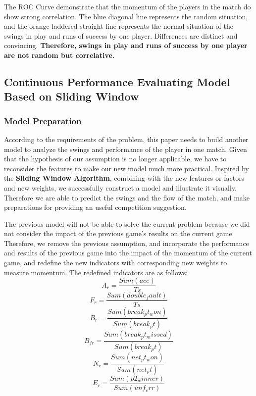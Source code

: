\documentclass{mcmthesis}
\begin{document}
The ROC Curve demonstrate that the momentum of the players in the match do show strong
correlation. The blue diagonal line represents the random situation, and the orange laddered
straight line represents the normal situation of the swings in play and runs of success by one player. Differences are distinct and convincing. {\bf Therefore, swings in play and runs of success by one
player are not random but correlative.}

\subsection{Continuous Performance Evaluating Model Based on Sliding Window}

\subsubsection{Model Preparation}
According to the requirements of the problem, this paper needs to build another model to
analyze the swings and performance of the player in one match. Given that the hypothesis of our
assumption is no longer applicable, we have to reconsider the features to make our new model
much more practical. Inspired by the {\bf Sliding Window Algorithm}, combining with the new
features or factors and new weights, we successfully construct a model and illustrate it visually. Therefore we are able to predict the swings and the flow of the match, and make preparations for
providing an useful competition suggestion.

 The previous model will not be able to solve the current problem because we did not consider
the impact of the previous game's results on the current game. Therefore, we remove the previous
assumption, and incorporate the performance and results of the previous game into the impact of
the momentum of the current game, and redefine the new indicators with corresponding new
weights to measure momentum. The redefined indicators are as follows:
\begin{equation} \label{7}
    A_{r}=\frac{Sum(ace)}{Ts}
\end{equation}
\begin{equation} \label{8}
    F_{r}=\frac{Sum(double_fault)}{Ts}
\end{equation}
\begin{equation} \label{9}
    B_{r}=\frac{Sum(break_pt_won)}{Sum(break_pt)}
\end{equation}
\begin{equation} \label{10}
    B_{fr}=\frac{Sum(break_pt_missed)}{Sum(break_pt)}
\end{equation}
\begin{equation} \label{11}
    N_{r}=\frac{Sum(net_pt_won)}{Sum(net_pt)}
\end{equation}
\begin{equation} \label{12}
    E_{r}=\frac{Sum(p2_winner)}{Sum(unf_err)}
\end{equation}
\end{document}
